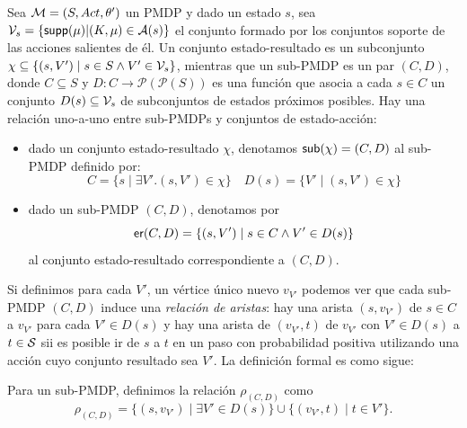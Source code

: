 \begin{definition}
	Sea $\mathcal{M}=(S, Act, \theta')$ un PMDP y dado un estado $s$, sea $\mathcal{V}_s = \{\textsf{supp}(\mu) | (K, \mu) \in \mathcal{A}(s)\}$ el conjunto formado por los conjuntos soporte de las acciones salientes de él. Un conjunto estado-resultado es un subconjunto $\chi \subseteq \{(s, V') \mid s \in S \wedge V' \in \mathcal{V}_s\}$, mientras que un sub-PMDP es un par $(C, D)$, donde $C \subseteq S$ y $D: C \rightarrow \mathscr{P}(\mathscr{P}(S))$ es una función que asocia a cada $s \in C$ un conjunto $D(s) \subseteq \mathcal{V}_s$ de subconjuntos de estados próximos posibles. Hay una relación uno-a-uno entre sub-PMDPs y conjuntos de estado-acción:

	\begin{itemize}
		\item dado un conjunto estado-resultado $\chi$, denotamos $\textsf{sub}(\chi) = (C, D)$ al
		      sub-PMDP definido por:
		      \[
			      C = \{s \mid \exists V' . (s, V') \in \chi\} \quad D(s) = \{V' \mid (s, V') \in \chi\}
		      \]

		\item dado un sub-PMDP $(C, D)$, denotamos por $$\textsf{er}(C,D) = \{(s,V') \mid s \in C
			      \wedge V' \in D(s)\}$$ al conjunto estado-resultado correspondiente a $(C, D)$.
	\end{itemize}
\end{definition}

Si definimos para cada $V'$, un vértice único nuevo $v_{V'}$ podemos ver que
cada sub-PMDP $(C, D)$ induce una \textit{relación de aristas}: hay una arista
$(s, v_{V'})$ de $s \in C$ a $v_{V'}$ para cada $V' \in D(s)$ y hay una arista
de $(v_{V'}, t)$ de $v_{V'}$ con $V' \in D(s)$ a $t \in \mathcal{S}$ sii es posible ir
de $s$ a $t$ en un paso con probabilidad positiva utilizando una acción cuyo
conjunto resultado sea $V'$. La definición formal es como sigue:

\begin{definition}
	Para un sub-PMDP, definimos la relación $\rho_{(C,D)}$ como
	\[
		\rho_{(C,D)} = \{(s, v_{V'}) \mid \exists V' \in D(s)\} \cup \{(v_{V'}, t) \mid t \in V' \}.
	\]
\end{definition}

